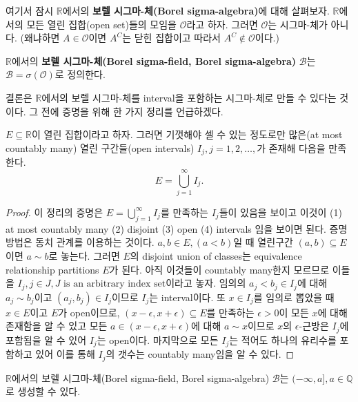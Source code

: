 \documentclass[b5paper,]{scrbook}
\theoremstyle{plain}
\theoremstyle{definition}
\numberwithin{equation}{section}
\let\BeginKnitrBlock\begin \let\EndKnitrBlock\end
\begin{document}
여기서 잠시 \(\mathbb{R}\)에서의 \textbf{보렐 시그마-체(Borel sigma-algebra)}에 대해 살펴보자. \(\mathbb{R}\)에서의 모든 열린 집합(open set)들의 모임을 \(\mathcal{O}\)라고 하자. 그러면 \(\mathcal{O}\)는 시그마-체가 아니다. (왜냐하면 \(A\in\mathcal{O}\)이면 \(A^{C}\)는 닫힌 집합이고 따라서 \(A^{C}\notin\mathcal{O}\)이다.)

\BeginKnitrBlock{definition}[보렐 시그마-체]
\protect\hypertarget{def:unnamed-chunk-81}{}{\label{def:unnamed-chunk-81} {} }\(\mathbb{R}\)에서의 \textbf{보렐 시그마-체(Borel sigma-field, Borel sigma-algebra)} \(\mathcal{B}\)는 \(\mathcal{B}=\sigma(\mathcal{O})\)로 정의한다.
\EndKnitrBlock{definition}

결론은 \(\mathbb{R}\)에서의 보렐 시그마-체를 interval을 포함하는 시그마-체로 만들 수 있다는 것이다. 그 전에 증명을 위해 한 가지 정리를 언급하겠다.

\BeginKnitrBlock{theorem}[열린 집합과 열린 구간들]
\protect\hypertarget{thm:unnamed-chunk-82}{}{\label{thm:unnamed-chunk-82} {} }\(E \subseteq \mathbb{R}\)이 열린 집합이라고 하자. 그러면 기껏해야 셀 수 있는 정도로만 많은(at most countably many) 열린 구간들(open intervals) \(I_{j}, j=1,2,\ldots,\)가 존재해 다음을 만족한다.
\[E=\bigcup_{j=1}^{\infty}I_{j}.\]
\EndKnitrBlock{theorem}

\BeginKnitrBlock{proof}
{}이 정리의 증명은 \(E=\bigcup_{j=1}^{\infty}I_{j}\)를 만족하는 \(I_{j}\)들이 있음을 보이고 이것이 (1) at most countably many (2) disjoint (3) open (4) intervals 임을 보이면 된다. 증명 방법은 동치 관계를 이용하는 것이다. \(a, b \in E, (a < b)\)일 때 열린구간 \((a,b)\subseteq E\)이면 \(a \sim b\)로 놓는다. 그러면 \(E\)의 disjoint union of classes는 equivalence relationship partitions \(E\)가 된다. 아직 이것들이 countably many한지 모르므로 이들을 \(I_{j}, j\in J, J \text{ is an arbitrary index set}\)이라고 놓자. 임의의 \(a_{j}<b_{j}\in I_{j}\)에 대해 \(a_{j} \sim b_{j}\)이고 \((a_{j}, b_{j}) \in I_{j}\)이므로 \(I_{j}\)는 interval이다. 또 \(x\in I_{j}\)를 임의로 뽑았을 때 \(x\in E\)이고 \(E\)가 open이므로, \((x-\epsilon, x+\epsilon)\subseteq E\)를 만족하는 \(\epsilon >0\)이 모든 \(x\)에 대해 존재함을 알 수 있고 모든 \(a\in (x-\epsilon, x+\epsilon)\)에 대해 \(a \sim x\)이므로 \(x\)의 \(\epsilon\)-근방은 \(I_{j}\)에 포함됨을 알 수 있어 \(I_{j}\)는 open이다. 마지막으로 모든 \(I_{j}\)는 적어도 하나의 유리수를 포함하고 있어 이를 통해 \(I_{j}\)의 갯수는 countably many임을 알 수 있다.
\EndKnitrBlock{proof}

\BeginKnitrBlock{theorem}[실수 구간에서의 보렐 시그마-체의 생성]
\protect\hypertarget{thm:unnamed-chunk-84}{}{\label{thm:unnamed-chunk-84} {} }\(\mathbb{R}\)에서의 보렐 시그마-체(Borel sigma-field, Borel sigma-algebra) \(\mathcal{B}\)는 \((-\infty, a], a\in\mathbb{Q}\)로 생성할 수 있다.
\EndKnitrBlock{theorem}
\end{document}
